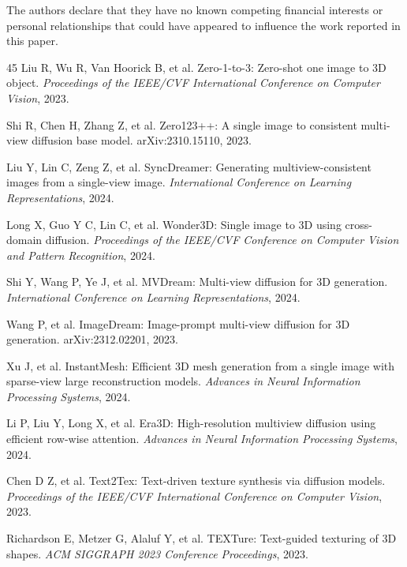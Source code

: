 \documentclass[times,twocolumn,final]{elsarticle}
\providecommand{\DIFaddbegin}{} %
\providecommand{\DIFaddend}{} %
\begin{document}
The authors declare that they have no known competing financial interests or personal relationships that could have appeared to influence the work reported in this paper.


\DIFaddbegin \begingroup
\linespread{0.94}\selectfont
\DIFaddend \begin{thebibliography}{45}
Liu R, Wu R, Van Hoorick B, et al. Zero-1-to-3: Zero-shot one image to 3D object. \textit{Proceedings of the IEEE/CVF International Conference on Computer Vision}, 2023.

Shi R, Chen H, Zhang Z, et al. Zero123++: A single image to consistent multi-view diffusion base model. arXiv:2310.15110, 2023.

Liu Y, Lin C, Zeng Z, et al. SyncDreamer: Generating multiview-consistent images from a single-view image. \textit{International Conference on Learning Representations}, 2024.

Long X, Guo Y C, Lin C, et al. Wonder3D: Single image to 3D using cross-domain diffusion. \textit{Proceedings of the IEEE/CVF Conference on Computer Vision and Pattern Recognition}, 2024.

Shi Y, Wang P, Ye J, et al. MVDream: Multi-view diffusion for 3D generation. \textit{International Conference on Learning Representations}, 2024.

Wang P, et al. ImageDream: Image-prompt multi-view diffusion for 3D generation. arXiv:2312.02201, 2023.

Xu J, et al. InstantMesh: Efficient 3D mesh generation from a single image with sparse-view large reconstruction models. \textit{Advances in Neural Information Processing Systems}, 2024.

Li P, Liu Y, Long X, et al. Era3D: High-resolution multiview diffusion using efficient row-wise attention. \textit{Advances in Neural Information Processing Systems}, 2024.

Chen D Z, et al. Text2Tex: Text-driven texture synthesis via diffusion models. \textit{Proceedings of the IEEE/CVF International Conference on Computer Vision}, 2023.

Richardson E, Metzer G, Alaluf Y, et al. TEXTure: Text-guided texturing of 3D shapes. \textit{ACM SIGGRAPH 2023 Conference Proceedings}, 2023.


\end{thebibliography}
\end{document}
